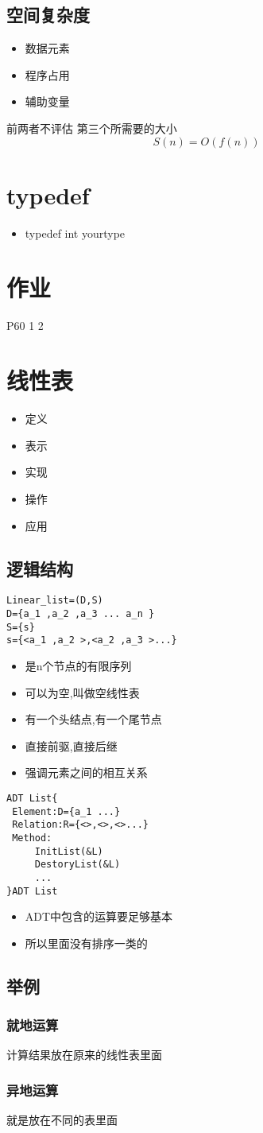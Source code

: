 \documentclass[11pt]{article}
\begin{document}
\subsection{空间复杂度}
\label{sec:org659a85e}
\begin{itemize}
\item 数据元素
\item 程序占用
\item 辅助变量
\end{itemize}
前两者不评估
第三个所需要的大小
\[
S(n)=O(f(n))
\]
\section{typedef}
\label{sec:org3e9d509}
\begin{itemize}
\item typedef int yourtype
\end{itemize}
\section{作业}
\label{sec:org1461d82}
P60 1 2
\section{线性表}
\label{sec:orgd14a2e9}
\begin{itemize}
\item 定义
\item 表示
\item 实现
\item 操作
\item 应用
\end{itemize}
\subsection{逻辑结构}
\label{sec:org558a33e}
\begin{verbatim}
Linear_list=(D,S)
D={a_1 ,a_2 ,a_3 ... a_n }
S={s}
s={<a_1 ,a_2 >,<a_2 ,a_3 >...}
\end{verbatim}
\begin{itemize}
\item 是n个节点的有限序列
\item 可以为空,叫做空线性表
\item 有一个头结点,有一个尾节点
\item 直接前驱,直接后继
\item 强调元素之间的相互关系
\end{itemize}
\begin{verbatim}
ADT List{
 Element:D={a_1 ...}
 Relation:R={<>,<>,<>...}
 Method:
     InitList(&L)
     DestoryList(&L)
     ...
}ADT List
\end{verbatim}
\begin{itemize}
\item ADT中包含的运算要足够基本
\item 所以里面没有排序一类的
\end{itemize}
\subsection{举例}
\label{sec:org6654986}
\subsubsection{就地运算}
\label{sec:orgafc8814}
计算结果放在原来的线性表里面
\subsubsection{异地运算}
\label{sec:org54fb024}
就是放在不同的表里面
\end{document}
